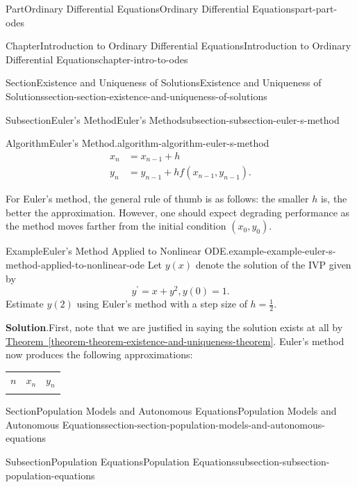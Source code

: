 \documentclass[twoside,10pt,]{book}
\newcommand{\blocktitlefont}{\relax}
\newcommand{\tabularfont}{\relax}
\newcommand{\xreffont}{\relax}
\numberwithin{equation}{part}
\newcommand{\hrulethick} {\noalign{\hrule height 0.11em}}
\newcommand{\amp}{&}
\begin{document}
\begin{partptx}{Part}{Ordinary Differential Equations}{}{Ordinary Differential Equations}{}{}{part-part-odes}
\begin{chapterptx}{Chapter}{Introduction to Ordinary Differential Equations}{}{Introduction to Ordinary Differential Equations}{}{}{chapter-intro-to-odes}
\begin{sectionptx}{Section}{Existence and Uniqueness of Solutions}{}{Existence and Uniqueness of Solutions}{}{}{section-section-existence-and-uniqueness-of-solutions}
\begin{subsectionptx}{Subsection}{Euler's Method}{}{Euler's Method}{}{}{subsection-subsection-euler-s-method}
\begin{algorithm}{Algorithm}{Euler's Method.}{}{algorithm-algorithm-euler-s-method}
\begin{align*}
x_n \amp = x_{n-1} + h \\
y_n \amp = y_{n-1} + hf(x_{n-1}, y_{n-1}) \text{.}
\end{align*}
%
\end{algorithm}
For Euler's method, the general rule of thumb is as follows: the smaller \(h\) is, the better the approximation. However, one should expect degrading performance as the method moves farther from the initial condition \((x_0, y_0)\).%
\begin{example}{Example}{Euler's Method Applied to Nonlinear ODE.}{example-example-euler-s-method-applied-to-nonlinear-ode}%
Let \(y(x)\) denote the solution of the IVP given by%
\begin{equation*}
y^\prime = x + y^2, y(0) = 1\text{.}
\end{equation*}
Estimate \(y(2)\) using Euler's method with a step size of \(h = \frac{1}{2}\).%
\par\smallskip%
\noindent\textbf{\blocktitlefont Solution}.\hypertarget{solution-example-euler-s-method-applied-to-nonlinear-ode-c}{}\quad{}First, note that we are justified in saying the solution exists at all by \hyperref[theorem-theorem-existence-and-uniqueness-theorem]{Theorem~{\xreffont\ref{theorem-theorem-existence-and-uniqueness-theorem}}}. Euler's method now produces the following approximations:%
\begin{center}%
{\tabularfont%
\begin{tabular}{lll}
\(n\)&\(x_n\)&\(y_n\)\tabularnewline\hrulethick
\end{tabular}
}%
\end{center}%
\end{example}
\end{subsectionptx}
\end{sectionptx}
%
%
\typeout{************************************************}
\typeout{************************************************}
%
\begin{sectionptx}{Section}{Population Models and Autonomous Equations}{}{Population Models and Autonomous Equations}{}{}{section-section-population-models-and-autonomous-equations}
%
%
\typeout{************************************************}
\typeout{************************************************}
%
\begin{subsectionptx}{Subsection}{Population Equations}{}{Population Equations}{}{}{subsection-subsection-population-equations}

\end{subsectionptx}
\end{sectionptx}
\end{chapterptx}
\end{partptx}
\end{document}
